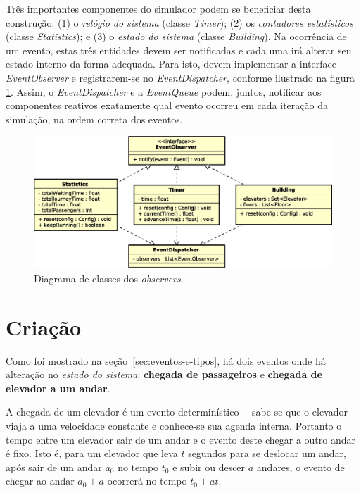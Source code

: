 Três importantes componentes do simulador podem se beneficiar desta construção:
(1) o \textit{relógio do sistema} (classe \textit{Timer}); (2) os
\textit{contadores estatísticos} (classe \textit{Statistics}); e (3) o
\textit{estado do sistema} (classe \textit{Building}). Na ocorrência de um
evento, estas três entidades devem ser notificadas e cada uma irá alterar seu
estado interno da forma adequada. Para isto, devem implementar a interface
\textit{EventObserver} e registrarem-se no \textit{EventDispatcher}, conforme
ilustrado na figura \ref{fig:diagram:observers}. Assim, o
\textit{EventDispatcher} e a \textit{EventQueue} podem, juntos, notificar aos
componentes reativos exatamente qual evento ocorreu em cada iteração da
simulação, na ordem correta dos eventos.

\begin{figure}[htb!]
  \centering
  \includegraphics[scale=0.6]{img/Observers.eps}
  \caption{Diagrama de classes dos \textit{observers}.}
\label{fig:diagram:observers}
\end{figure}

\section{\label{sec:model:generator}Criação}

Como foi mostrado na seção~\ref{sec:eventos-e-tipos}, há dois eventos onde há
alteração no \textit{estado do sistema}: \textbf{chegada de passageiros} e
\textbf{chegada de elevador a um andar}.

A chegada de um elevador é um evento determinístico~-~sabe-se que o elevador
viaja a uma velocidade constante e conhece-se sua agenda interna. Portanto o
tempo entre um elevador sair de um andar e o evento deste chegar a outro andar é
fixo. Isto é, para um elevador que leva $t$ segundos para se deslocar um andar,
após sair de um andar $a_{0}$ no tempo $t_{0}$ e subir ou descer $a$ andares, o evento
de chegar ao andar $a_{0} + a$ ocorrerá no tempo $t_{0} + at$.

